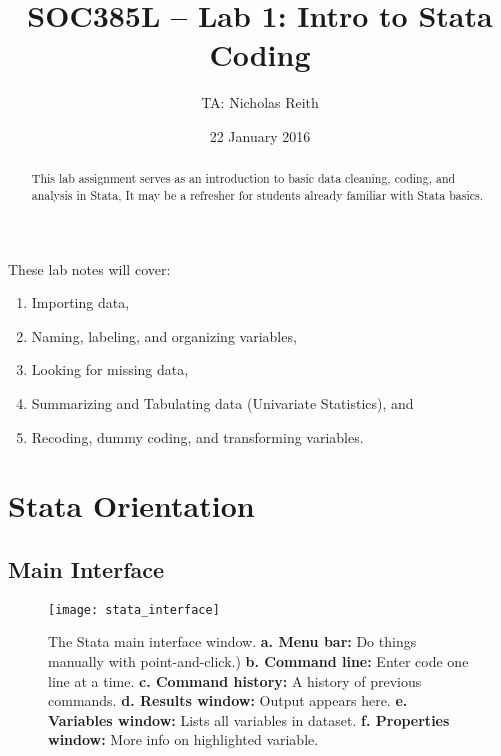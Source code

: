 \documentclass{tufte-handout}
\title{SOC385L -- Lab 1: Intro to Stata Coding}
\author{TA: Nicholas Reith}
\date{22 January 2016}  %
\begin{document}
\maketitle%

\begin{abstract}
\noindent This lab assignment serves as an introduction to basic data cleaning, coding, and analysis in Stata, It may be a refresher for students already familiar with Stata basics.
\end{abstract}


\noindent These lab notes will cover:
\begin{enumerate}
	\item Importing data,
	\item Naming, labeling, and organizing variables,
	\item Looking for missing data,
	\item Summarizing and Tabulating data (Univariate Statistics), and
	\item Recoding, dummy coding, and transforming variables.
\end{enumerate}

\section{Stata Orientation \protect{}}
\subsection{Main Interface}
\begin{figure}
   \texttt{[image: stata\_interface]}
\caption{The Stata main interface window.\newline
{\bf a. Menu bar:} Do things manually with point-and-click.)\newline
{\bf b. Command line:} Enter code one line at a time.\newline
{\bf c. Command history:} A history of previous commands.\newline
{\bf d. Results window:} Output appears here.\newline
{\bf e. Variables window:} Lists all variables in dataset.\newline
{\bf f. Properties window:} More info on highlighted variable.}
\label{fig:fig1}
\end{figure}
\end{document}
